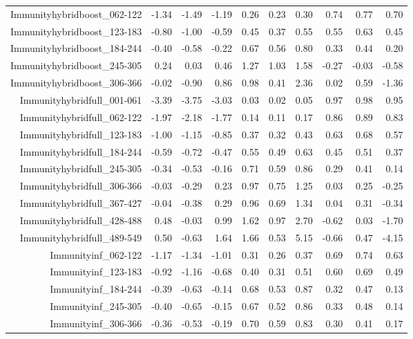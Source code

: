 \begin{table}[ht]
\begin{tabular}{rrrrrrrrrr}
  Immunityhybridboost\_062-122 & -1.34 & -1.49 & -1.19 & 0.26 & 0.23 & 0.30 & 0.74 & 0.77 & 0.70 \\ 
  Immunityhybridboost\_123-183 & -0.80 & -1.00 & -0.59 & 0.45 & 0.37 & 0.55 & 0.55 & 0.63 & 0.45 \\ 
  Immunityhybridboost\_184-244 & -0.40 & -0.58 & -0.22 & 0.67 & 0.56 & 0.80 & 0.33 & 0.44 & 0.20 \\ 
  Immunityhybridboost\_245-305 & 0.24 & 0.03 & 0.46 & 1.27 & 1.03 & 1.58 & -0.27 & -0.03 & -0.58 \\ 
  Immunityhybridboost\_306-366 & -0.02 & -0.90 & 0.86 & 0.98 & 0.41 & 2.36 & 0.02 & 0.59 & -1.36 \\ 
  Immunityhybridfull\_001-061 & -3.39 & -3.75 & -3.03 & 0.03 & 0.02 & 0.05 & 0.97 & 0.98 & 0.95 \\ 
  Immunityhybridfull\_062-122 & -1.97 & -2.18 & -1.77 & 0.14 & 0.11 & 0.17 & 0.86 & 0.89 & 0.83 \\ 
  Immunityhybridfull\_123-183 & -1.00 & -1.15 & -0.85 & 0.37 & 0.32 & 0.43 & 0.63 & 0.68 & 0.57 \\ 
  Immunityhybridfull\_184-244 & -0.59 & -0.72 & -0.47 & 0.55 & 0.49 & 0.63 & 0.45 & 0.51 & 0.37 \\ 
  Immunityhybridfull\_245-305 & -0.34 & -0.53 & -0.16 & 0.71 & 0.59 & 0.86 & 0.29 & 0.41 & 0.14 \\ 
  Immunityhybridfull\_306-366 & -0.03 & -0.29 & 0.23 & 0.97 & 0.75 & 1.25 & 0.03 & 0.25 & -0.25 \\ 
  Immunityhybridfull\_367-427 & -0.04 & -0.38 & 0.29 & 0.96 & 0.69 & 1.34 & 0.04 & 0.31 & -0.34 \\ 
  Immunityhybridfull\_428-488 & 0.48 & -0.03 & 0.99 & 1.62 & 0.97 & 2.70 & -0.62 & 0.03 & -1.70 \\ 
  Immunityhybridfull\_489-549 & 0.50 & -0.63 & 1.64 & 1.66 & 0.53 & 5.15 & -0.66 & 0.47 & -4.15 \\ 
  Immunityinf\_062-122 & -1.17 & -1.34 & -1.01 & 0.31 & 0.26 & 0.37 & 0.69 & 0.74 & 0.63 \\ 
  Immunityinf\_123-183 & -0.92 & -1.16 & -0.68 & 0.40 & 0.31 & 0.51 & 0.60 & 0.69 & 0.49 \\ 
  Immunityinf\_184-244 & -0.39 & -0.63 & -0.14 & 0.68 & 0.53 & 0.87 & 0.32 & 0.47 & 0.13 \\ 
  Immunityinf\_245-305 & -0.40 & -0.65 & -0.15 & 0.67 & 0.52 & 0.86 & 0.33 & 0.48 & 0.14 \\ 
  Immunityinf\_306-366 & -0.36 & -0.53 & -0.19 & 0.70 & 0.59 & 0.83 & 0.30 & 0.41 & 0.17 \\ 

\end{tabular}
\end{table}
